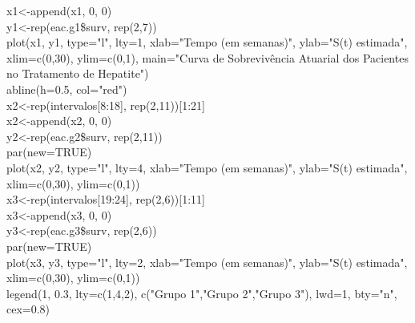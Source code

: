\documentclass[12pt,a4paper]{article}
\begin{document}
	x1<-append(x1, 0, 0)\\
	y1<-rep(eac.g1\$surv, rep(2,7))\\
	plot(x1, y1, type="l", lty=1, xlab="Tempo (em semanas)", ylab="S(t) estimada", xlim=c(0,30), ylim=c(0,1), main="Curva de Sobrevivência Atuarial dos Pacientes no Tratamento de Hepatite")\\
	abline(h=0.5, col="red")\\
	x2<-rep(intervalos[8:18], rep(2,11))[1:21]\\
	x2<-append(x2, 0, 0)\\
	y2<-rep(eac.g2\$surv, rep(2,11))\\
	par(new=TRUE)\\
	plot(x2, y2, type="l", lty=4,  xlab="Tempo (em semanas)", ylab="S(t) estimada", xlim=c(0,30), ylim=c(0,1))\\
	x3<-rep(intervalos[19:24], rep(2,6))[1:11]\\
	x3<-append(x3, 0, 0)\\
	y3<-rep(eac.g3\$surv, rep(2,6))\\
	par(new=TRUE)\\
	plot(x3, y3, type="l", lty=2,  xlab="Tempo (em semanas)", ylab="S(t) estimada", xlim=c(0,30), ylim=c(0,1))\\
	legend(1, 0.3, lty=c(1,4,2), c("Grupo 1","Grupo 2","Grupo 3"), lwd=1, bty="n", cex=0.8)\\
\end{document}
